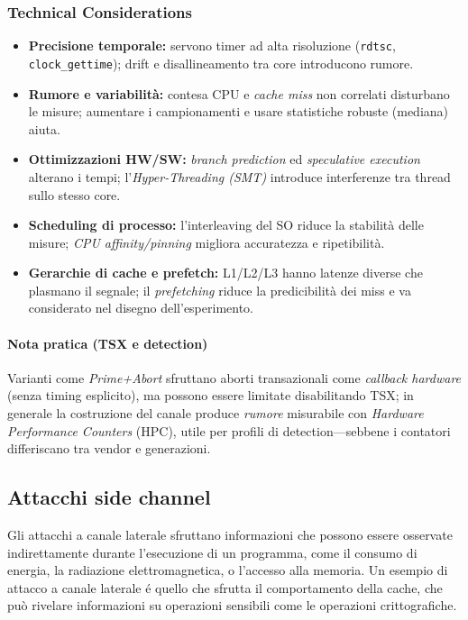 \subsubsection{Technical Considerations}
\begin{itemize}
  \item \textbf{Precisione temporale:} servono timer ad alta risoluzione (\texttt{rdtsc}, \texttt{clock\_gettime}); drift e disallineamento tra core introducono rumore.
  \item \textbf{Rumore e variabilità:} contesa CPU e \emph{cache miss} non correlati disturbano le misure; aumentare i campionamenti e usare statistiche robuste (mediana) aiuta.
  \item \textbf{Ottimizzazioni HW/SW:} \emph{branch prediction} ed \emph{speculative execution} alterano i tempi; l’\emph{Hyper-Threading (SMT)} introduce interferenze tra thread sullo stesso core.
  \item \textbf{Scheduling di processo:} l’interleaving del SO riduce la stabilità delle misure; \emph{CPU affinity/pinning} migliora accuratezza e ripetibilità.
  \item \textbf{Gerarchie di cache e prefetch:} L1/L2/L3 hanno latenze diverse che plasmano il segnale; il \emph{prefetching} riduce la predicibilità dei miss e va considerato nel disegno dell’esperimento.
\end{itemize}

\paragraph{Nota pratica (TSX e detection)}
Varianti come \emph{Prime+Abort} sfruttano aborti transazionali come \emph{callback hardware} (senza timing esplicito), ma possono essere limitate disabilitando TSX; in generale la costruzione del canale produce \emph{rumore} misurabile con \emph{Hardware Performance Counters} (HPC), utile per profili di detection—sebbene i contatori differiscano tra vendor e generazioni.

\subsection{Attacchi side channel}
Gli attacchi a canale laterale sfruttano informazioni che possono essere osservate indirettamente durante l'esecuzione di un programma, come il consumo di energia, la radiazione elettromagnetica, o l'accesso alla memoria. Un esempio di attacco a canale laterale \'e quello che sfrutta il comportamento della cache, che può rivelare informazioni su operazioni sensibili come le operazioni crittografiche.

